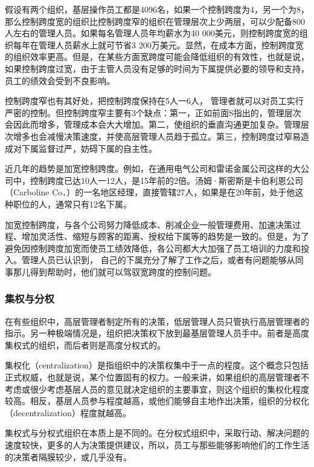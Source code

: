     假设有两个组织，基层操作员工都是4096名，如果一个控制跨度为4，另一个为8，那么控制跨度宽的组织比控制跨度窄的组织在管理层次上少两层，可以少配备800人左右的管理人员。如果每名管理人员年均薪水为40 000美元，则控制跨度宽的组织每年在管理人员薪水上就可节省3 200万美元。显然，在成本方面，控制跨度宽的组织效率更高。但是，在某些方面宽跨度可能会降低组织的有效性，也就是说，如果控制跨度过宽，由于主管人员没有足够的时间为下属提供必要的领导和支持，员工的绩效会受到不良影响。

    控制跨度窄也有其好处，把控制跨度保持在5人一6人， 管理者就可以对员工实行严密的控制。但控制跨度窄主要有3个缺点：第一，正如前面S指出的，管理层次会因此而增多，管理成本会大大增加。第二，使组织的垂直沟通更加复杂。管理层次增多也会减慢决策速度，并使高层管理人员趋于孤立。第三，控制跨度过窄易造成对下属监督过严，妨碍下属的自主性。

    近几年的趋势是加宽控制跨度。例如，在通用电气公司和雷诺金属公司这样的大公司中，控制跨度已达10人一12人，是15年前的2倍。汤姆·斯密斯是卡伯利恩公司（Carboline Co．）的一名地区经理，直接管辖27人，如果是在20年前，处于他这种职位的人，通常只有12名下属。

    加宽控制跨度，与各个公司努力降低成本、削减企业一般管理费用、加速决策过程、增加灵活性、缩短与顾客的距离、授权给下属等的趋势是一致的。但是，为了避免因控制跨度加宽而使员工绩效降低，各公司都大大加强了员工培训的力度和投入。管理人员已认识到， 自己的下属充分了解了工作之后，或者有问题能够从同事那儿得到帮助时，他们就可以驾驭宽跨度的控制问题。

    \subsubsection {集权与分权}

    在有些组织中，高层管理者制定所有的决策，低层管理人员只管执行高层管理者的指示。另一种极端情况是，组织把决策权下放到最基层管理人员手中。前者是高度集权式的组织，而后者则是高度分权式的。

    集权化（centralization）是指组织中的决策权集中于一点的程度。这个概念只包括正式权威，也就是说，某个位置固有的权力。一般来讲，如果组织的高层管理者不考虑或很少考虑基层人员的意见就决定组织的主要事宜，则这个组织的集权化程度较高。相反，基层人员参与程度越高，或他们能够自主地作出决策，组织的分权化（decentralization）程度就越高。

    集权式与分权式组织在本质上是不同的。在分权式组织中，采取行动、解决问题的速度较快，更多的人为决策提供建议，所以，员工与那些能够影响他们的工作生活的决策者隔膜较少，或几乎没有。

